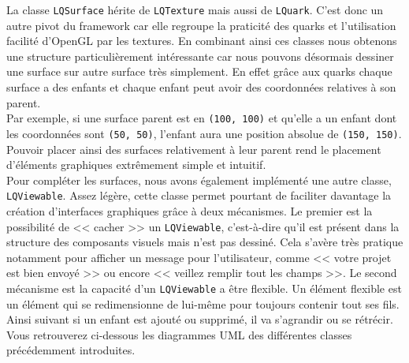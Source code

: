\documentclass[twoside]{report}
\begin{document}
La classe \verb!LQSurface! hérite de \verb!LQTexture! mais aussi de \verb!LQuark!. C'est donc un autre pivot du framework car elle regroupe la praticité des quarks et l'utilisation facilité d'OpenGL par les textures. En combinant ainsi ces classes nous obtenons une structure particulièrement intéressante car nous pouvons désormais dessiner une surface sur autre surface très simplement. En effet grâce aux quarks chaque surface a des enfants et chaque enfant peut avoir des coordonnées relatives à son parent.\\

Par exemple, si une surface parent est en \verb!(100, 100)! et qu'elle a un enfant dont les coordonnées sont \verb!(50, 50)!, l'enfant aura une position absolue de \verb!(150, 150)!. Pouvoir placer ainsi des surfaces relativement à leur parent rend le placement d'éléments graphiques extrêmement simple et intuitif.\\

Pour compléter les surfaces, nous avons également implémenté une autre classe, \verb!LQViewable!. Assez légère, cette classe permet pourtant de faciliter davantage la création d'interfaces graphiques grâce à deux mécanismes. Le premier est la possibilité de << cacher >> un \verb!LQViewable!, c'est-à-dire qu'il est présent dans la structure des composants visuels mais n'est pas dessiné. Cela s'avère très pratique notamment pour afficher un message pour l'utilisateur, comme << votre projet est bien envoyé >> ou encore << veillez remplir tout les champs >>. Le second mécanisme est la capacité d'un \verb!LQViewable! a être flexible. Un élément flexible est un élément qui se redimensionne de lui-même pour toujours contenir tout ses fils. Ainsi suivant si un enfant est ajouté ou supprimé, il va s'agrandir ou se rétrécir.\\

Vous retrouverez ci-dessous les diagrammes UML des différentes classes précédemment introduites.\\
\end{document}
